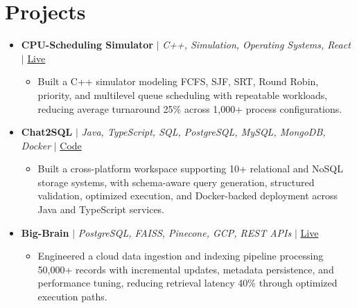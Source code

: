 \documentclass[letterpaper,10pt]{article}
\newcommand{\resumeItem}[1]{\item\small{{#1 \vspace{-2pt}}}}
\newcommand{\resumeProjectHeading}[1]{\item \small #1 \vspace{-2pt}}
\newcommand{\resumeSubHeadingListStart}{\begin{itemize}[leftmargin=0.0in,label={}]}
\newcommand{\resumeSubHeadingListEnd}{\end{itemize}}
\newcommand{\resumeProjItemListStart}{\begin{itemize}[leftmargin=0.15in,label=\textbullet,itemsep=0pt,topsep=0pt,parsep=0pt,partopsep=0pt]}
\newcommand{\resumeProjItemListEnd}{\end{itemize}\vspace{1pt}}
\begin{document}
\section{Projects}
\resumeSubHeadingListStart
  \resumeProjectHeading{\textbf{CPU-Scheduling Simulator} $|$ \emph{C++, Simulation, Operating Systems, React} $|$ \href{https://cpu-scheduler-amber.vercel.app/}{Live}}
  \resumeProjItemListStart
    \resumeItem{Built a C++ simulator modeling FCFS, SJF, SRT, Round Robin, priority, and multilevel queue scheduling with repeatable workloads, reducing average turnaround 25\% across 1,000+ process configurations.}
  \resumeProjItemListEnd
  \resumeProjectHeading{\textbf{Chat2SQL} $|$ \emph{Java, TypeScript, SQL, PostgreSQL, MySQL, MongoDB, Docker} $|$ \href{https://github.com/SAHAJ-BHADJA/Chat2SQL}{Code}}
  \resumeProjItemListStart
    \resumeItem{Built a cross-platform workspace supporting 10+ relational and NoSQL storage systems, with schema-aware query generation, structured validation, optimized execution, and Docker-backed deployment across Java and TypeScript services.}
  \resumeProjItemListEnd
  \resumeProjectHeading{\textbf{Big-Brain} $|$ \emph{PostgreSQL, FAISS, Pinecone, GCP, REST APIs} $|$ \href{https://big-brain-pied.vercel.app/}{Live}}
  \resumeProjItemListStart
    \resumeItem{Engineered a cloud data ingestion and indexing pipeline processing 50,000+ records with incremental updates, metadata persistence, and performance tuning, reducing retrieval latency 40\% through optimized execution paths.}
  \resumeProjItemListEnd
\resumeSubHeadingListEnd
\end{document}
